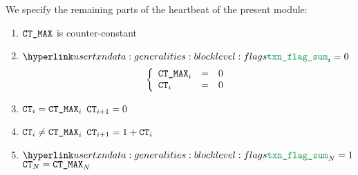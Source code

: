 We specify the remaining parts of the heartbeat of the present module:
\begin{enumerate}
	\item $\texttt{CT\_MAX}$ is counter-constant
	\item \If $\transactionFlagSum _{i} = 0$ \Then
		\[
			\left\{ \begin{array}{lclr}
				\texttt{CT\_MAX} _{i} & = & 0 \\
				\texttt{CT}    _{i} & = & 0 \\
			\end{array} \right.
		\]
	\item \If $\texttt{CT} _{i} =    \texttt{CT\_MAX} _{i}$ \Then $\texttt{CT} _{i + 1} = 0$
	\item \If $\texttt{CT} _{i} \neq \texttt{CT\_MAX} _{i}$ \Then $\texttt{CT} _{i + 1} = 1 + \texttt{CT} _{i}$
	\item \If $\transactionFlagSum _{N} = 1$ \Then $\texttt{CT} _{N} = \texttt{CT\_MAX} _{N}$
\end{enumerate}
